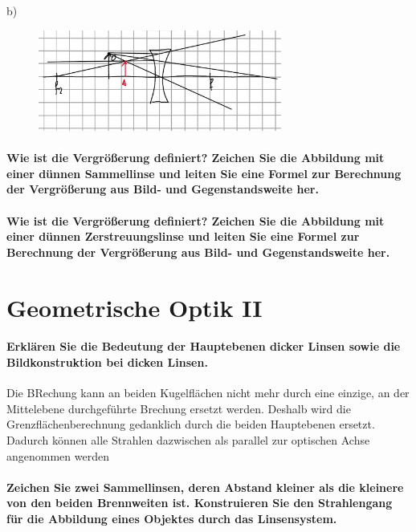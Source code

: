 \documentclass[a4paper, 11pt, parskip=half]{scrartcl}
\begin{document}
b)
\begin{figure}[H]
    \centering
    \includegraphics[width=8cm]{image/17/geo16b}
\end{figure}








\paragraph{Wie ist die Vergrößerung definiert? Zeichen Sie die Abbildung mit einer dünnen
Sammellinse und leiten Sie eine Formel zur Berechnung der Vergrößerung aus Bild- und
Gegenstandsweite her.}

\paragraph{Wie ist die Vergrößerung definiert? Zeichen Sie die Abbildung mit einer dünnen
Zerstreuungslinse und leiten Sie eine Formel zur Berechnung der Vergrößerung aus Bild- und
Gegenstandsweite her.}

\newpage

\section{Geometrische Optik II}

\paragraph{Erklären Sie die Bedeutung der Hauptebenen dicker Linsen sowie die Bildkonstruktion bei
dicken Linsen.}

Die BRechung kann an beiden Kugelflächen nicht mehr durch eine einzige, an der Mittelebene durchgeführte Brechung ersetzt werden. Deshalb wird die Grenzflächenberechnung gedanklich durch die beiden Hauptebenen ersetzt. Dadurch können alle Strahlen dazwischen als parallel zur optischen Achse angenommen werden

\paragraph{Zeichen Sie zwei Sammellinsen, deren Abstand kleiner als die kleinere von den beiden
Brennweiten ist. Konstruieren Sie den Strahlengang für die Abbildung eines Objektes durch
das Linsensystem.}
\end{document}

